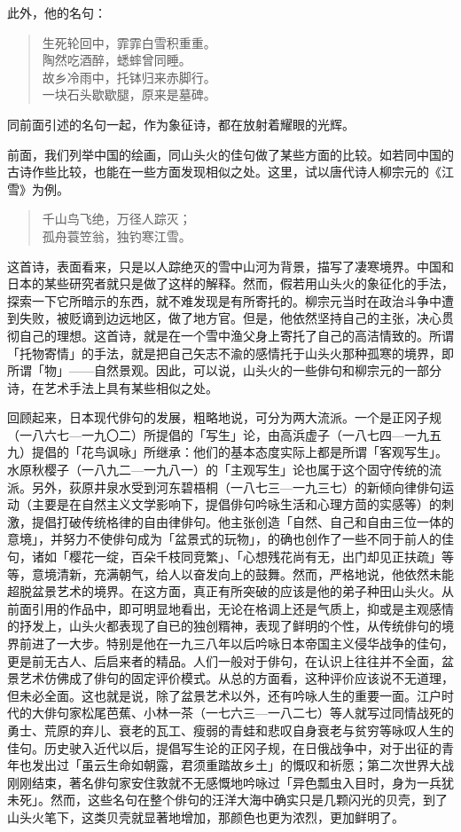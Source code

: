 {    此外，他的名句：
    \begin{quote}
        生死轮回中，霏霏白雪积重重。\\
        陶然吃酒醉，蟋蟀曾同睡。\\
        故乡冷雨中，托钵归来赤脚行。\\
        一块石头歇歇腿，原来是墓碑。
    \end{quote}
    同前面引述的名句一起，作为象征诗，都在放射着耀眼的光辉。

    前面，我们列举中国的绘画，同山头火的佳句做了某些方面的比较。如若同中国的古诗作些比较，也能在一些方面发现相似之处。这里，试以唐代诗人柳宗元的《江雪》为例。

    \begin{quote}
        千山鸟飞绝，万径人踪灭；\\
        孤舟蓑笠翁，独钓寒江雪。
    \end{quote}

    这首诗，表面看来，只是以人踪绝灭的雪中山河为背景，描写了凄寒境界。中国和日本的某些研究者就只是做了这样的解释。然而，假若用山头火的象征化的手法，探索一下它所暗示的东西，就不难发现是有所寄托的。柳宗元当时在政治斗争中遭到失败，被贬谪到边远地区，做了地方官。但是，他依然坚持自己的主张，决心贯彻自己的理想。这首诗，就是在一个雪中渔父身上寄托了自己的高洁情致的。所谓「托物寄情」的手法，就是把自己矢志不渝的感情托于山头火那种孤寒的境界，即所谓「物」——自然景观。因此，可以说，山头火的一些俳句和柳宗元的一部分诗，在艺术手法上具有某些相似之处。

    回顾起来，日本现代俳句的发展，粗略地说，可分为两大流派。一个是正冈子规（一八六七—一九〇二）所提倡的「写生」论，由高浜虚子（一八七四—一九五九）提倡的「花鸟讽咏」所继承：他们的基本态度实际上都是所谓「客观写生」。水原秋樱子（一八九二—一九八一）的「主观写生」论也属于这个固守传统的流派。另外，荻原井泉水受到河东碧梧桐（一八七三—一九三七）的新倾向律俳句运动（主要是在自然主义文学影响下，提倡俳句吟咏生活和心理方茴的实感等）的刺激，提倡打破传统格律的自由律俳句。他主张创造「自然、自己和自由三位一体的意境」，并努力不使俳句成为「盆景式的玩物」，的确也创作了一些不同于前人的佳句，诸如「樱花一绽，百朵千枝同竞繁」、「心想残花尚有无，出门却见正扶疏」等等，意境清新，充满朝气，给人以奋发向上的鼓舞。然而，严格地说，他依然未能超脱盆景艺术的境界。在这方面，真正有所突破的应该是他的弟子种田山头火。从前面引用的作品中，即可明显地看出，无论在格调上还是气质上，抑或是主观感情的抒发上，山头火都表现了自已的独创糈神，表现了鲜明的个性，从传统俳句的境界前进了一大步。特别是他在一九三八年以后吟咏日本帝国主义侵华战争的佳句，更是前无古人、后启来者的精品。人们一般对于俳句，在认识上往往并不全面，盆景艺术仿佛成了俳句的固定评价模式。从总的方面看，这种评价应该说不无道理，但未必全面。这也就是说，除了盆景艺术以外，还有吟咏人生的重要一面。江户时代的大俳句家松尾芭蕉、小林一茶（一七六三—一八二七）等人就写过同情战死的勇士、荒原的弃儿、衰老的瓦工、瘦弱的青蛙和悲叹自身衰老与贫穷等咏叹人生的佳句。历史驶入近代以后，提倡写生论的正冈子规，在日俄战争中，对于出征的青年也发出过「虽云生命如朝露，君须重踏故乡土」的慨叹和祈愿；第二次世界大战刚刚结束，著名俳句家安住敦就不无感慨地吟咏过「异色瓢虫入目时，身为一兵犹未死」。然而，这些名句在整个俳句的汪洋大海中确实只是几颗闪光的贝壳，到了山头火笔下，这类贝壳就显著地增加，那颜色也更为浓烈，更加鲜明了。

}
